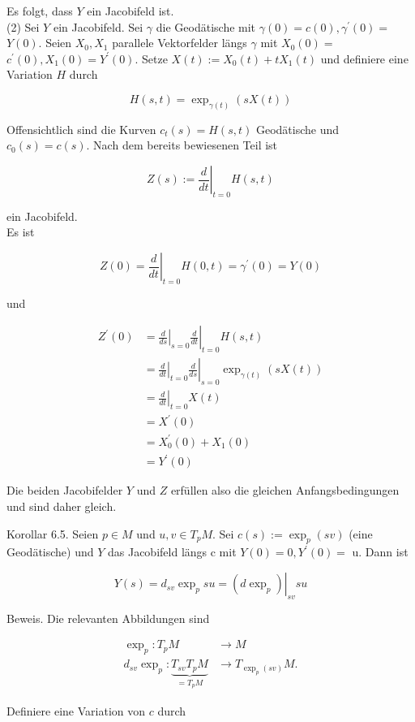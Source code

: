 \documentclass[10pt, letterpaper]{article}
\begin{document}
Es folgt, dass $Y$ ein Jacobifeld ist.\\
(2) Sei $Y$ ein Jacobifeld. Sei $\gamma$ die Geodätische mit $\gamma(0)=c(0), \gamma^{\prime}(0)=$ $Y(0)$. Seien $X_{0}, X_{1}$ parallele Vektorfelder längs $\gamma$ mit $X_{0}(0)=$ $c^{\prime}(0), X_{1}(0)=Y^{\prime}(0)$. Setze $X(t):=X_{0}(t)+t X_{1}(t)$ und definiere eine Variation $H$ durch

$$
H(s, t)=\exp _{\gamma(t)}(s X(t))
$$

Offensichtlich sind die Kurven $c_{t}(s)=H(s, t)$ Geodätische und $c_{0}(s)=c(s)$. Nach dem bereits bewiesenen Teil ist

$$
Z(s):=\left.\frac{d}{d t}\right|_{t=0} H(s, t)
$$

ein Jacobifeld.\\
Es ist

$$
Z(0)=\left.\frac{d}{d t}\right|_{t=0} H(0, t)=\gamma^{\prime}(0)=Y(0)
$$

und

$$
\begin{aligned}
Z^{\prime}(0) & =\left.\left.\frac{d}{d s}\right|_{s=0} \frac{d}{d t}\right|_{t=0} H(s, t) \\
& =\left.\left.\frac{d}{d t}\right|_{t=0} \frac{d}{d s}\right|_{s=0} \exp _{\gamma(t)}(s X(t)) \\
& =\left.\frac{d}{d t}\right|_{t=0} X(t) \\
& =X^{\prime}(0) \\
& =X_{0}^{\prime}(0)+X_{1}(0) \\
& =Y^{\prime}(0)
\end{aligned}
$$

Die beiden Jacobifelder $Y$ und $Z$ erfüllen also die gleichen Anfangsbedingungen und sind daher gleich.

Korollar 6.5. Seien $p \in M$ und $u, v \in T_{p} M$. Sei $c(s):=\exp _{p}(s v)$ (eine Geodätische) und $Y$ das Jacobifeld längs c mit $Y(0)=0, Y^{\prime}(0)=$ u. Dann ist

$$
Y(s)=d_{s v} \exp _{p} s u=\left.\left(d \exp _{p}\right)\right|_{s v} s u
$$

Beweis. Die relevanten Abbildungen sind

$$
\begin{aligned}
\exp _{p}: T_{p} M & \rightarrow M \\
d_{s v} \exp _{p}: \underbrace{T_{s v} T_{p} M}_{=T_{p} M} & \rightarrow T_{\exp _{p}(s v)} M .
\end{aligned}
$$

Definiere eine Variation von $c$ durch
\end{document}

